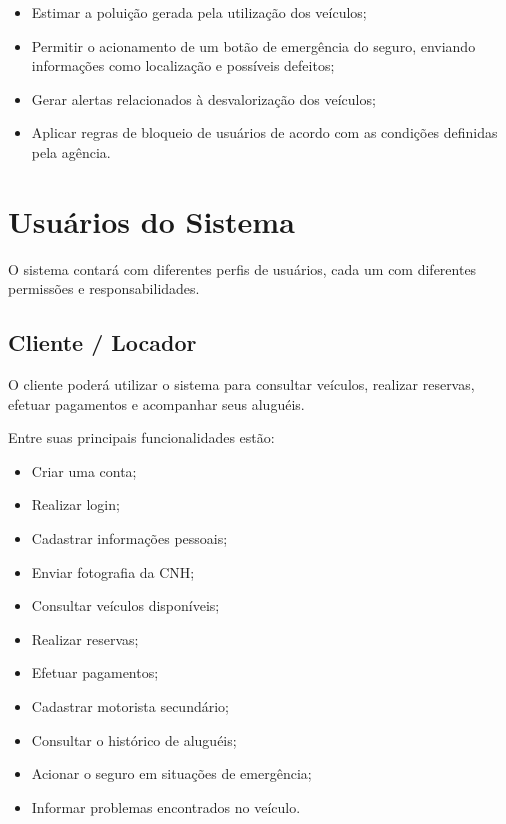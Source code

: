 \documentclass[12pt,a4paper]{report}
\begin{document}
\begin{itemize}
    \item Estimar a poluição gerada pela utilização dos veículos;

    \item Permitir o acionamento de um botão de emergência do seguro, enviando informações como localização e possíveis defeitos;

    \item Gerar alertas relacionados à desvalorização dos veículos;

    \item Aplicar regras de bloqueio de usuários de acordo com
    as condições definidas pela agência.

\end{itemize}

    
\chapter{Usuários do Sistema}

O sistema contará com diferentes perfis de usuários, cada um
com diferentes permissões e responsabilidades.

\section{Cliente / Locador}

O cliente poderá utilizar o sistema para consultar veículos,
realizar reservas, efetuar pagamentos e acompanhar seus aluguéis.

Entre suas principais funcionalidades estão:

\begin{itemize}

    \item Criar uma conta;
    \item Realizar login;
    \item Cadastrar informações pessoais;
    \item Enviar fotografia da CNH;
    \item Consultar veículos disponíveis;
    \item Realizar reservas;
    \item Efetuar pagamentos;
    \item Cadastrar motorista secundário;
    \item Consultar o histórico de aluguéis;
    \item Acionar o seguro em situações de emergência;
    \item Informar problemas encontrados no veículo.

\end{itemize}
\end{document}
